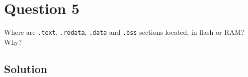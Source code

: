 \section*{Question 5}

Where are \texttt{.text}, \texttt{.rodata}, \texttt{.data} and \texttt{.bss} sections located, in flash or RAM?
Why?

\subsection*{Solution}
